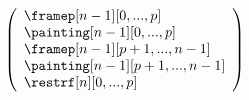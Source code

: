 \documentclass{msc}
\begin{document}
\begin{itemize}
$$\begin{array}{llcl}
\begin{array}{l}
                                \left(\begin{array}{l}
                                    \framep[n-1][0,...,p]  \\
                                    \painting[n-1][0,...,p] \\
                                    \framep[n-1][p+1,...,n-1]  \\
                                    \painting[n-1][p+1,...,n-1] \\
                                    \restrf[n][0,...,p] \\
                                  \end{array}\right)
                                \end{array}
          \end{array}
        $$



\end{itemize}
\end{document}
